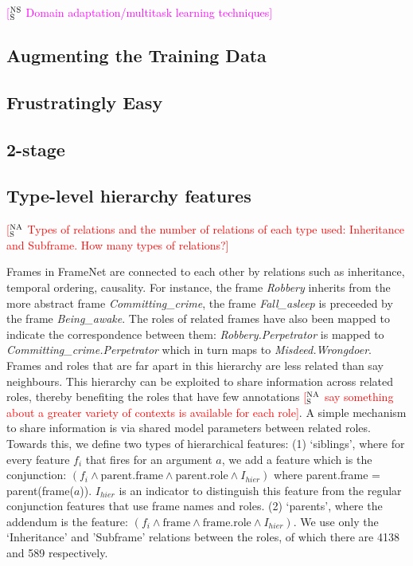 \documentclass[11pt,a4paper]{article}
\newcommand{\ensuretext}[1]{#1}
\newcommand{\nssmarker}{\ensuretext{\textcolor{magenta}{\ensuremath{^{\textsc{NS}}_{\textsc{S}}}}}}
\newcommand{\nasmarker}{\ensuretext{\textcolor{red}{\ensuremath{^{\textsc{NA}}_{\textsc{S}}}}}}
\newcommand{\arkcomment}[3]{\ensuretext{\textcolor{#3}{[#1 #2]}}}
\newcommand{\nss}[1]{\arkcomment{\nssmarker}{#1}{magenta}}
\newcommand{\mk}[1]{\arkcomment{\nasmarker}{#1}{red}}
\begin{document}
\nss{Domain adaptation/multitask learning techniques}

\subsection{Augmenting the Training Data}

\subsection{Frustratingly Easy}

\subsection{2-stage}

\subsection{Type-level hierarchy features}
\mk{Types of relations and the number of relations of each type used: Inheritance and Subframe. How many types of relations?}

Frames in FrameNet are connected to each other by relations such as inheritance, temporal ordering, causality. 
For instance, the frame \textit{Robbery} inherits from the more abstract frame \textit{Committing\_crime}, the 
frame \textit{Fall\_asleep} is preceeded by the frame \textit{Being\_awake}. The roles of related frames have 
also been mapped to indicate the correspondence between them: \textit{Robbery.Perpetrator} is mapped to 
\textit{Committing\_crime.Perpetrator} which in turn maps to \textit{Misdeed.Wrongdoer}. Frames and roles that are far
apart in this hierarchy are less related than say neighbours.
This hierarchy can be exploited to share information across related roles, thereby benefiting the roles 
that have few annotations \mk{say something about a greater variety of contexts is available for each role}. 
A simple mechanism to share information is via shared model parameters between related roles. Towards this, we define two types of
hierarchical features: (1) `siblings', where for every feature $f_i$ that fires for an argument $a$, we add a feature which is the conjunction: 
$(f_i \wedge \textrm{parent.frame} \wedge \textrm{parent.role} \wedge I_{hier})$ where parent.frame = parent(frame($a$)). 
$I_{hier}$ is an indicator to distinguish this feature from the regular conjunction features that use frame names and roles.
(2) `parents', where the addendum is the feature: $(f_i \wedge \textrm{frame} \wedge \textrm{frame.role} \wedge I_{hier})$.
We use only the `Inheritance' and 'Subframe' relations between the roles, of which there are 4138 and 589 respectively.
\end{document}
